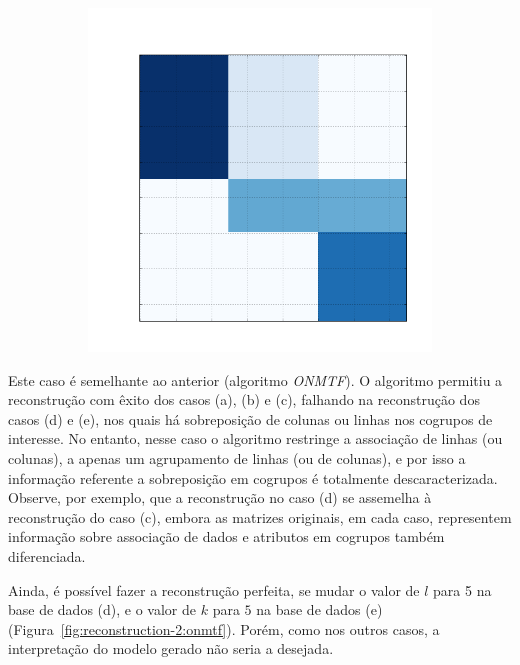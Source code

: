 \documentclass[
    12pt,                %
    oneside,            %
    a4paper,            %
    english,            %
    brazil                %
    ]{abntex2ppgsi}
\begin{document}
\begin{figure}[H]
\begin{subfigure}[b]{0.18\textwidth}
        \caption{}
    \end{subfigure}
    \begin{subfigure}[b]{0.18\textwidth}
        \includegraphics[width=\textwidth]{img/e-reconstruction-fnmtf.png}
    \caption{}
    \end{subfigure}
    \label{fig:reconstruction:fnmtf}
\end{figure}

Este caso é semelhante ao anterior (algoritmo \textit{ONMTF}).
O algoritmo permitiu a reconstrução com êxito dos casos (a), (b) e (c), falhando na reconstrução dos casos (d) e (e), nos quais há sobreposição de colunas ou linhas nos cogrupos de interesse. No entanto, nesse caso o algoritmo restringe a associação de linhas (ou colunas), a apenas um agrupamento de linhas (ou de colunas), e por isso a informação referente a sobreposição em cogrupos é totalmente descaracterizada.
Observe, por exemplo, que a reconstrução no caso (d) se assemelha à reconstrução do caso (c), embora as matrizes originais, em cada caso, representem informação sobre associação de dados e atributos em cogrupos também diferenciada.

Ainda, é possível fazer a reconstrução perfeita, se mudar o valor de $l$ para 5 na base de dados (d), e o valor de $k$ para $5$ na base de dados (e) (Figura~\ref{fig:reconstruction-2:onmtf}).
Porém, como nos outros casos, a interpretação do modelo gerado não seria a desejada.
\end{document}
